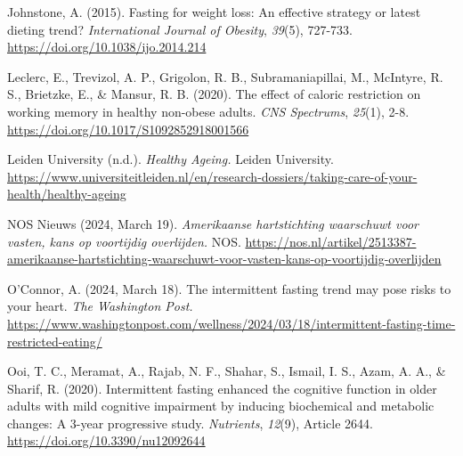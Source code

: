 \documentclass[authordate, reflection,issue]{jote-new-article}
\begin{document}
Johnstone, A. (2015). Fasting for weight loss: An effective strategy or latest dieting trend? \emph{International Journal of Obesity}, \emph{39}(5), 727-733. \url{https://doi.org/10.1038/ijo.2014.214}







Leclerc, E., Trevizol, A. P., Grigolon, R. B., Subramaniapillai, M., McIntyre, R. S., Brietzke, E., \& Mansur, R. B. (2020). The effect of caloric restriction on working memory in healthy non-obese adults. \emph{CNS Spectrums}, \emph{25}(1), 2-8. \url{https://doi.org/10.1017/S1092852918001566}







Leiden University (n.d.). \emph{Healthy Ageing.} Leiden University. \url{https://www.universiteitleiden.nl/en/research-dossiers/taking-care-of-your-health/healthy-ageing}







NOS Nieuws (2024, March 19). \emph{Amerikaanse hartstichting waarschuwt voor vasten, kans op voortijdig overlijden.} NOS. \href{https://nos.nl/artikel/2513387-amerikaanse-hartstichting-waarschuwt-voor-vasten-kans-op-voortijdig-overlijden}{https://nos.nl/artikel/2513387-amerikaanse-hartstichting-waarschuwt-voor-vasten-kans-op-voortijdig-overlijden}







O'Connor, A. (2024, March 18). The intermittent fasting trend may pose risks to your heart. \emph{The Washington Post.} \url{https://www.washingtonpost.com/wellness/2024/03/18/intermittent-fasting-time-restricted-eating/}







Ooi, T. C., Meramat, A., Rajab, N. F., Shahar, S., Ismail, I. S., Azam, A. A., \& Sharif, R. (2020). Intermittent fasting enhanced the cognitive function in older adults with mild cognitive impairment by inducing biochemical and metabolic changes: A 3-year progressive study. \emph{Nutrients}, \emph{12}(9), Article 2644. \url{https://doi.org/10.3390/nu12092644}
\end{document}

